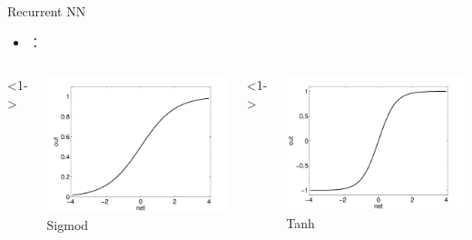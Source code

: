 \begin{xframe}{Recurrent NN}

    \begin{itemize}
        \item {：\\
        }
    \end{itemize}


    \begin{columns}
        <1->
        \begin{center}
            \includegraphics[width=\textwidth,height=0.5\textheight]{./style/images/logistic.pdf}
            Sigmod
        \end{center}

        <1->
        \begin{center}
            \includegraphics[width=\textwidth,height=0.5\textheight]{./style/images/tanh.pdf}
            Tanh
        \end{center}

    \end{columns}

\end{xframe}

